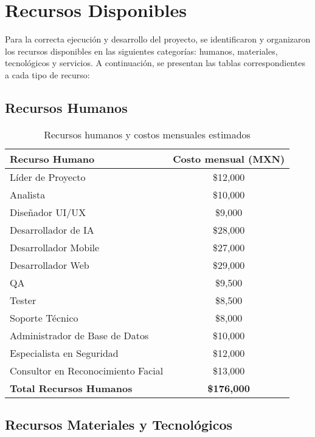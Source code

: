 \section{Recursos Disponibles}


Para la correcta ejecución y desarrollo del proyecto, se identificaron y organizaron los recursos disponibles en las siguientes categorías: humanos, materiales, tecnológicos y servicios. A continuación, se presentan las tablas correspondientes a cada tipo de recurso:

\subsection{Recursos Humanos}

\begin{table}[h!]
\centering
\footnotesize
\setlength{\tabcolsep}{3.5pt}
\renewcommand{\arraystretch}{0.98}
\begin{tabular}{|l|c|}
\hline
\textbf{Recurso Humano} & \textbf{Costo mensual (MXN)} \\
\hline
Líder de Proyecto & \$12,000 \\
Analista & \$10,000 \\
Diseñador UI/UX & \$9,000 \\
Desarrollador de IA & \$28,000 \\
Desarrollador Mobile & \$27,000 \\
Desarrollador Web & \$29,000 \\
QA & \$9,500 \\
Tester & \$8,500 \\
Soporte Técnico & \$8,000 \\
Administrador de Base de Datos & \$10,000 \\
Especialista en Seguridad & \$12,000 \\
Consultor en Reconocimiento Facial & \$13,000 \\
\hline
\textbf{Total Recursos Humanos} & \textbf{\$176,000} \\
\hline
\end{tabular}
\caption{Recursos humanos y costos mensuales estimados}
\end{table}

\subsection{Recursos Materiales y Tecnológicos}

